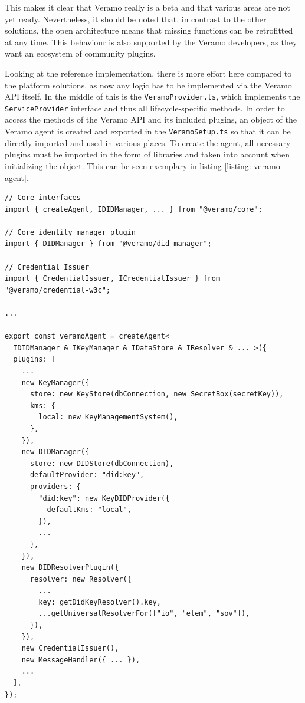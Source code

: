     This makes it clear that Veramo really is a beta and that various areas are not yet ready. Nevertheless, it should be noted that, in contrast to the other solutions, the open architecture means that missing functions can be retrofitted at any time. This behaviour is also supported by the Veramo developers, as they want an ecosystem of community plugins.
    
    Looking at the reference implementation, there is more effort here compared to the platform solutions, as now any logic has to be implemented via the Veramo API itself. In the middle of this is the \texttt{VeramoProvider.ts}, which implements the \texttt{ServiceProvider} interface and thus all lifecycle-specific methods. In order to access the methods of the Veramo API and its included plugins, an object of the Veramo agent is created and exported in the \texttt{VeramoSetup.ts} so that it can be directly imported and used in various places. To create the agent, all necessary plugins must be imported in the form of libraries and taken into account when initializing the object. This can be seen exemplary in listing \ref{listing: veramo agent}. 
    \newline
    \begin{lstlisting}[style=ES6, caption=Veramo agent creation, label={listing: veramo agent}]
// Core interfaces
import { createAgent, IDIDManager, ... } from "@veramo/core";

// Core identity manager plugin
import { DIDManager } from "@veramo/did-manager";

// Credential Issuer
import { CredentialIssuer, ICredentialIssuer } from "@veramo/credential-w3c";

...

export const veramoAgent = createAgent<
  IDIDManager & IKeyManager & IDataStore & IResolver & ... >({
  plugins: [
    ...
    new KeyManager({
      store: new KeyStore(dbConnection, new SecretBox(secretKey)),
      kms: {
        local: new KeyManagementSystem(),
      },
    }),
    new DIDManager({
      store: new DIDStore(dbConnection),
      defaultProvider: "did:key",
      providers: {
        "did:key": new KeyDIDProvider({
          defaultKms: "local",
        }),
        ...
      },
    }),
    new DIDResolverPlugin({
      resolver: new Resolver({
        ...
        key: getDidKeyResolver().key,
        ...getUniversalResolverFor(["io", "elem", "sov"]),
      }),
    }),
    new CredentialIssuer(),
    new MessageHandler({ ... }),
    ...
  ],
});\end{lstlisting}
    

